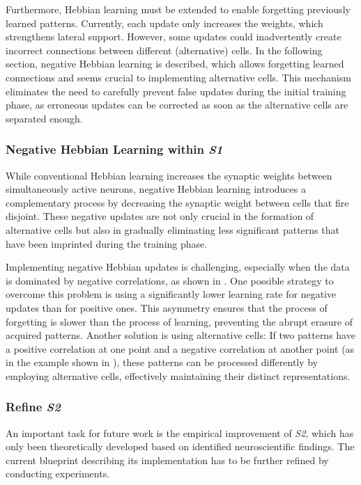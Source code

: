 Furthermore, Hebbian learning  must be extended to enable forgetting previously learned patterns.
Currently, each update only increases the weights, which strengthens lateral support.
However, some updates could inadvertently create incorrect connections between different (alternative) cells.
In the following section, negative Hebbian learning is described, which allows forgetting learned connections and seems crucial to implementing alternative cells.
This mechanism eliminates the need to carefully prevent false updates during the initial training phase, as erroneous updates can be corrected as soon as the alternative cells are separated enough.

\subsubsection{Negative Hebbian Learning within \emph{S1}}
While conventional Hebbian learning \cite{hebb_organization_1949} increases the synaptic weights between simultaneously active neurons, negative Hebbian learning introduces a complementary process by decreasing the synaptic weight between cells that fire disjoint.
These negative updates are not only crucial in the formation of alternative cells but also in gradually eliminating less significant patterns that have been imprinted during the training phase.

Implementing negative Hebbian updates is challenging, especially when the data is dominated by negative correlations, as shown in .
One possible strategy to overcome this problem is using a significantly lower learning rate for negative updates than for positive ones.
This asymmetry ensures that the process of forgetting is slower than the process of learning, preventing the abrupt erasure of acquired patterns.
Another solution is using alternative cells: If two patterns have a positive correlation at one point and a negative correlation at another point (as in the example shown in ), these patterns can be processed differently by employing alternative cells, effectively maintaining their distinct representations.


\subsubsection{Refine \emph{S2}}
An important task for future work is the empirical improvement of \emph{S2}, which has only been theoretically developed based on identified neuroscientific findings. The current blueprint describing its implementation has to be further refined by conducting experiments.

